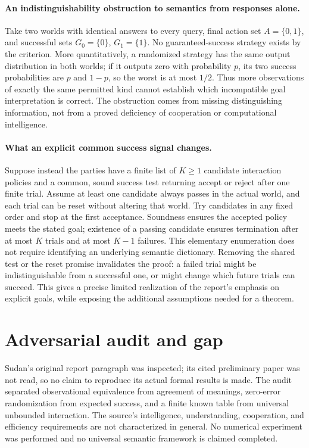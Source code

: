 \documentclass[11pt]{article}
\begin{document}
\paragraph{An indistinguishability obstruction to semantics from responses alone.}
Take two worlds with identical answers to every query, final action set
$A=\{0,1\}$, and successful sets $G_0=\{0\}$, $G_1=\{1\}$.
No guaranteed-success strategy exists by the criterion. More quantitatively,
a randomized strategy has the same output distribution in both worlds; if
it outputs zero with probability $p$, its two success probabilities are $p$
and $1-p$, so the worst is at most $1/2$.
Thus more observations of exactly the same permitted kind cannot establish
which incompatible goal interpretation is correct. The obstruction comes
from missing distinguishing information, not from a proved deficiency of
cooperation or computational intelligence.

\paragraph{What an explicit common success signal changes.}
Suppose instead the parties have a finite list of $K\ge1$ candidate
interaction policies and a common, sound success test returning accept or
reject after one finite trial. Assume at least one candidate always passes
in the actual world, and each trial can be reset without altering that world.
Try candidates in any fixed order and stop at the first acceptance.
Soundness ensures the accepted policy meets the stated goal; existence of a
passing candidate ensures termination after at most $K$ trials and at most
$K-1$ failures. This elementary enumeration does not require identifying an
underlying semantic dictionary. Removing the shared test or the reset promise
invalidates the proof: a failed trial might be indistinguishable from a
successful one, or might change which future trials can succeed.
This gives a precise limited realization of the report's emphasis on explicit
goals, while exposing the additional assumptions needed for a theorem.

\section{Adversarial audit and gap}
Sudan's original report paragraph was inspected; its cited preliminary paper
was not read, so no claim to reproduce its actual formal results is made.
The audit separated observational equivalence from agreement of meanings,
zero-error randomization from expected success, and a finite known table from
universal unbounded interaction. The source's intelligence, understanding,
cooperation, and efficiency requirements are not characterized in general.
No numerical experiment was performed and no universal semantic framework is
claimed completed.
\end{document}

